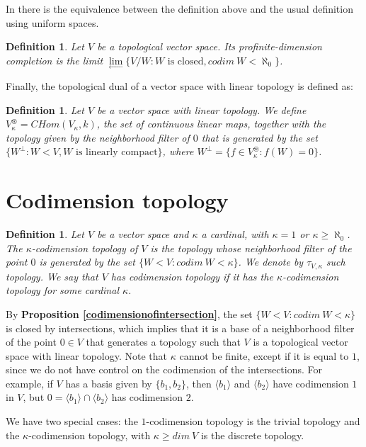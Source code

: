 \documentclass[a4paper,12pt]{article}
\newtheorem{defi}[prop]{Definition}
\theoremstyle{bloco}
\begin{document}
In \cite{Wa} there is the equivalence between the definition above and the usual definition using uniform spaces.

\begin{defi}Let $V$ be a topological vector space. Its profinite-dimension completion is the limit $\lim\limits_{\longleftarrow}\{V/W: W \text{ is closed}, codim \ W < \aleph_{0}\}$.
\end{defi}

Finally, the topological dual of a vector space with linear topology is defined as:

\begin{defi}Let $V$ be a vector space with linear topology. We define $V_{\kappa}^{\circledast} = CHom(V_{\kappa},k)$, the set of continuous linear maps, together with the topology given by the neighborhood filter of $0$ that is generated by the set $\{W^{\perp}: W < V, W \text{ is linearly compact}\}$, where $W^{\perp} = \{f \in V_{\kappa}^{\circledast}: f(W) = 0\}$.
\end{defi}


 \section{Codimension topology}

\begin{defi}Let $V$ be a vector space and $\kappa$ a cardinal, with $\kappa = 1$ or $\kappa \geqslant \aleph_{0}$. The $\kappa$-codimension topology of $V$ is the topology whose neighborhood filter of the point $0$ is generated by the set $\{W < V: codim \ W < \kappa\}$. We denote by $\tau_{V,\kappa}$ such topology. We say that $V$ has codimension topology if it has the $\kappa$-codimension topology for some cardinal $\kappa$.
\end{defi}

By \textbf{Proposition \ref{codimensionofintersection}}, the set $\{W < V: codim \ W < \kappa\}$ is closed by intersections, which implies that it is a base of a neighborhood filter of the point $0 \in V$ that generates a topology such that $V$ is a topological vector space with linear topology. Note that $\kappa$ cannot be finite, except if it is equal to $1$, since we do not have control on the codimension of the intersections. For example, if $V$ has a basis given by $\{b_{1},b_{2}\}$, then $\langle b_{1}\rangle$ and $\langle b_{2}\rangle$ have codimension $1$ in $V$, but $0 = \langle b_{1}\rangle \cap \langle b_{2}\rangle$ has codimension $2$.

We have two special cases: the $1$-codimension topology is the trivial topology and the $\kappa$-codimension topology, with $\kappa \geqslant dim \ V$ is the discrete topology.
\end{document}
